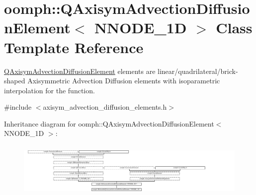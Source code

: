 \hypertarget{classoomph_1_1QAxisymAdvectionDiffusionElement}{}\section{oomph\+:\+:Q\+Axisym\+Advection\+Diffusion\+Element$<$ N\+N\+O\+D\+E\+\_\+1D $>$ Class Template Reference}
\label{classoomph_1_1QAxisymAdvectionDiffusionElement}


\hyperlink{classoomph_1_1QAxisymAdvectionDiffusionElement}{Q\+Axisym\+Advection\+Diffusion\+Element} elements are linear/quadrilateral/brick-\/shaped Axisymmetric Advection Diffusion elements with isoparametric interpolation for the function.  




{\ttfamily \#include $<$axisym\+\_\+advection\+\_\+diffusion\+\_\+elements.\+h$>$}

Inheritance diagram for oomph\+:\+:Q\+Axisym\+Advection\+Diffusion\+Element$<$ N\+N\+O\+D\+E\+\_\+1D $>$\+:\begin{figure}[H]
\begin{center}
\leavevmode
\includegraphics[height=2.692308cm]{classoomph_1_1QAxisymAdvectionDiffusionElement}
\end{center}
\end{figure}
